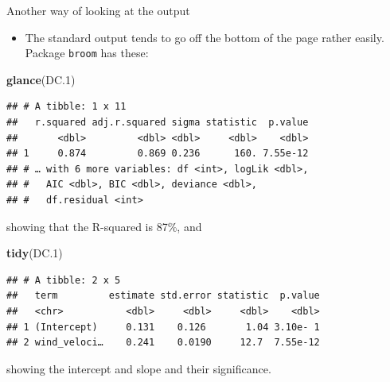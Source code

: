 \documentclass[ignorenonframetext,]{beamer}
\newenvironment{Shaded}{\begin{snugshade}}{\end{snugshade}}
\newcommand{\FloatTok}[1]{\textcolor[rgb]{0.00,0.00,0.81}{#1}}
\newcommand{\KeywordTok}[1]{\textcolor[rgb]{0.13,0.29,0.53}{\textbf{#1}}}
\newcommand{\NormalTok}[1]{#1}
\providecommand{\tightlist}{%
  \setlength{\itemsep}{0pt}\setlength{\parskip}{0pt}}
\begin{document}
\begin{frame}[fragile]{Another way of looking at the output}
\protect\hypertarget{another-way-of-looking-at-the-output}{}

\begin{itemize}
\tightlist
\item
  The standard output tends to go off the bottom of the page rather
  easily. Package \texttt{broom} has these:
\end{itemize}

\begin{Shaded}
\begin{Highlighting}[]
\KeywordTok{glance}\NormalTok{(DC}\FloatTok{.1}\NormalTok{)}
\end{Highlighting}
\end{Shaded}

\begin{verbatim}
## # A tibble: 1 x 11
##   r.squared adj.r.squared sigma statistic  p.value
##       <dbl>         <dbl> <dbl>     <dbl>    <dbl>
## 1     0.874         0.869 0.236      160. 7.55e-12
## # … with 6 more variables: df <int>, logLik <dbl>,
## #   AIC <dbl>, BIC <dbl>, deviance <dbl>,
## #   df.residual <int>
\end{verbatim}

showing that the R-squared is 87\%, and

\begin{Shaded}
\begin{Highlighting}[]
\KeywordTok{tidy}\NormalTok{(DC}\FloatTok{.1}\NormalTok{)}
\end{Highlighting}
\end{Shaded}

\begin{verbatim}
## # A tibble: 2 x 5
##   term         estimate std.error statistic  p.value
##   <chr>           <dbl>     <dbl>     <dbl>    <dbl>
## 1 (Intercept)     0.131    0.126       1.04 3.10e- 1
## 2 wind_veloci…    0.241    0.0190     12.7  7.55e-12
\end{verbatim}

showing the intercept and slope and their significance.

\end{frame}
\end{document}
